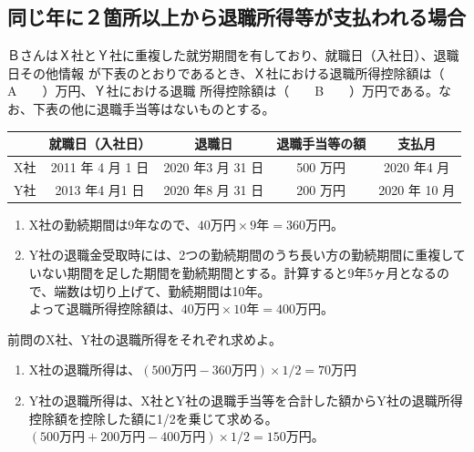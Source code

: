 \newpage

\subsection{同じ年に２箇所以上から退職所得等が支払われる場合}

\begin{fillblank}[年金1 2020 問題1(6)\textcircled{2}]
  ＢさんはＸ社とＹ社に重複した就労期間を有しており、就職日（入社日）、退職日その他情報
が下表のとおりであるとき、Ｘ社における退職所得控除額は（　　A　　）万円、Ｙ社における退職
所得控除額は（　　B　　）万円である。なお、下表の他に退職手当等はないものとする。

\begin{table}[htb]
  \centering
  \begin{tabular}{|c|c|c|c|c|}
    \hline
     & 就職日（入社日） & 退職日 & 退職手当等の額 &  支払月 \\ \hline
    X社 & 2011 年 4 月 1 日 & 2020 年3 月 31 日 & 500 万円 & 2020 年4 月 \\ \hline
    Y社 & 2013 年4 月1 日& 2020 年8 月 31 日& 200 万円 & 2020 年 10 月 \\ \hline
  \end{tabular}
\end{table}
\end{fillblank}

\begin{answerbox}
  \begin{enumerate}[A:]
    \item X社の勤続期間は9年なので、$40万円 \times 9年 = 360万円$。
    \item Y社の退職金受取時には、2つの勤続期間のうち長い方の勤続期間に重複していない期間を足した期間を勤続期間とする。計算すると9年5ヶ月となるので、端数は切り上げて、勤続期間は10年。\\
よって退職所得控除額は、$40万円 \times 10年 = 400万円$。
  \end{enumerate}
  
\end{answerbox}

\begin{fillblank}[自作 2026/10/20]
  前問のX社、Y社の退職所得をそれぞれ求めよ。
\end{fillblank}

\begin{answerbox}
  \begin{enumerate}[A:]
    \item X社の退職所得は、$(500万円 - 360万円) \times 1/2 = 70万円$
    \item Y社の退職所得は、X社とY社の退職手当等を合計した額からY社の退職所得控除額を控除した額に1/2を乗じて求める。$(500万円+200万円-400万円)\times 1/2 = 150万円$。
  \end{enumerate}
\end{answerbox}

